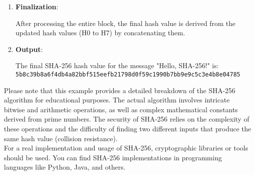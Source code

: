 \documentclass{report}
\begin{document}
{\begin{enumerate}[label=\textbf{Step \arabic*}:]
		For each round (0 to 63), the compression function is applied to update the hash values. The compression function involves various bitwise and arithmetic operations that update the working variables $a$, $b$, $c$, and $d$.
		
		\item \textbf{Finalization}:
		
		After processing the entire block, the final hash value is derived from the updated hash values (H0 to H7) by concatenating them.
		
		\item \textbf{Output}:
		
		The final SHA-256 hash value for the message "Hello, SHA-256!" is:
		\texttt{5b8c39b8a6f4db4a82bbf515eefb21798d0f59c1990b7bb9e9c5c3e4b8e04785}
		
	\end{enumerate}
	
	Please note that this example provides a detailed breakdown of the SHA-256 algorithm for educational purposes. The actual algorithm involves intricate bitwise and arithmetic operations, as well as complex mathematical constants derived from prime numbers. The security of SHA-256 relies on the complexity of these operations and the difficulty of finding two different inputs that produce the same hash value (collision resistance).\\
	For a real implementation and usage of SHA-256, cryptographic libraries or tools should be used. You can find SHA-256 implementations in programming languages like Python, Java, and others.
}
\end{document}
